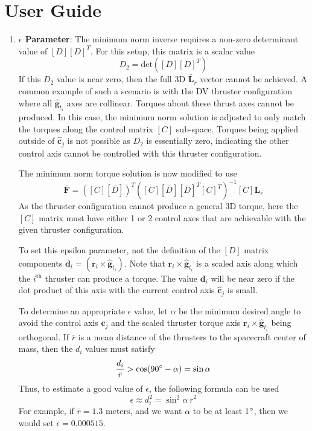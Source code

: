 
\section{User Guide}
\begin{enumerate}


\item \textbf{$\epsilon$ Parameter}: The minimum norm inverse requires a non-zero determinant value of $[D][D]^{T}$.  For this setup, this matrix is a scalar value
\begin{equation}
	D_{2} = \text{det}([D][D]^{T})
\end{equation}
If this $D_{2}$ value is near zero, then the full 3D $\bar{\bm L}_{r}$ vector cannot be achieved.  A common example of such a scenario is with the DV thruster configuration where all $\hat{\bm g}_{t_{i}}$ axes are collinear.  Torques about these thrust axes cannot be produced.  In this case, the minimum norm solution is adjusted to only match the torques along the control matrix $[C]$ sub-space.  Torques being applied outside of $\hat{\bm c}_{j}$ is not possible as $D_{2}$ is essentially zero, indicating the other control axis cannot be controlled with this thruster configuration.

The minimum norm torque solution is now modified to use
\begin{equation}
	\bar{\bm F} = ([C][\bar D])^{T}( [C][\bar D][\bar D]^{T}[C]^{T})^{-1} [C] {\bm L}_{r}
\end{equation}
As the thruster configuration cannot produce a general 3D torque, here the $[C]$ matrix must have either 1 or 2 control axes that are achievable with the given thruster configuration.

To set this epsilon parameter, not the definition of the $[D]$ matrix components $\bm d_{i} = (\bm r_{i} \times \hat{\bm g}_{t_{i}})$. Note that $\bm r_{i} \times \hat{\bm g}_{t_{i}}$ is a scaled axis along which the $i^{\text{th}}$ thruster can produce a torque.  The value $\bm d_{i}$ will be near zero if the dot product of this axis with the current control axis $\hat{\bm c}_{j}$ is small.

To determine an appropriate $\epsilon$ value, let $\alpha$ be the minimum desired angle to avoid the control axis $\hat{\bm c}_{j}$ and the scaled thruster torque axis $\bm r_{i} \times \hat{\bm g}_{t_{i}}$ being orthogonal.  If $\bar r$ is a mean distance of the thrusters to the spacecraft center of mass, then the $d_{i}$ values must satisfy
\begin{equation}
	\frac{d_{i}}{\bar r} > \cos(90^{\circ} - \alpha) = \sin\alpha
\end{equation}
Thus, to estimate a good value of $\epsilon$, the following formula can be used
\begin{equation}
	\epsilon \approx d_{i}^{2} = \sin^{2}\!\alpha \ \bar{r}^{2}
\end{equation}
For example, if $\bar{r} = 1.3$ meters, and we want $\alpha$ to be at least 1$^{\circ}$, then we would set $\epsilon = 0.000515$.


\end{enumerate}
